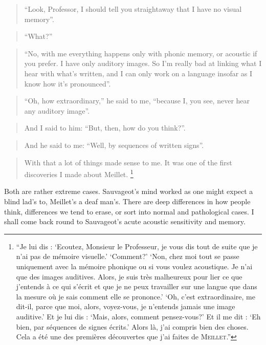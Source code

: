 \documentclass[output=paper]{langscibook}
\begin{document}
\begin{quotation}
``Look, Professor, I should tell you straightaway that I have no visual memory''.
\end{quotation}

\begin{quotation}
``What?''
\end{quotation}

\begin{quotation}
``No, with me everything happens only with phonic memory, or acoustic if you prefer. I have only auditory images. So I'm really bad at linking what I hear with what’s written, and I can only work on a language insofar as I know how it’s pronounced''.
\end{quotation}

\begin{quotation}
``Oh, how extraordinary,'' he said to me, ``because I, you see, never hear any auditory image''.
\end{quotation}

\begin{quotation}
And I said to him: ``But, then, how do you think?''.
\end{quotation}

\begin{quotation}
And he said to me: ``Well, by sequences of written signs''.
\end{quotation}

\begin{quotation}
With that a lot of things made sense to me. It was one of the first discoveries I made about Meillet. \citep[193]{Sauvageot1992}\footnote{``Je lui dis : `Ecoutez, Monsieur le Professeur, je vous dis tout de suite que je n'ai pas de mémoire visuelle.' `Comment?' `Non, chez moi tout se passe uniquement avec la mémoire phonique ou si vous voulez acoustique. Je n'ai que des images auditives. Alors, je suis très malheureux pour lier ce que j'entends à ce qui s'écrit et que je ne peux travailler sur une langue que dans la mesure où je sais comment elle se prononce.' `Oh, c'est extraordinaire, me dit-il, parce que moi, alors, voyez-vous, je n'entends jamais une image auditive.' Et je lui dis : `Mais, alors, comment pensez-vous?' Et il me dit : `Eh bien, par séquences de signes écrits.' Alors là, j'ai compris bien des choses. Cela a été une des premières découvertes que j'ai faites de \textsc{Meillet}.''}
\end{quotation}

Both are rather extreme cases. Sauvageot's mind worked as one might expect a blind lad's to, Meillet's a deaf man's. There are deep differences in how people think, differences we tend to erase, or sort into normal and pathological cases. I shall come back round to Sauvageot’s acute acoustic sensitivity and memory.
\end{document}
